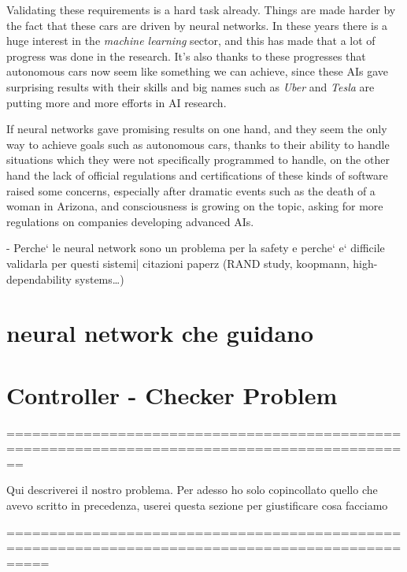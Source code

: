 Validating these requirements is a hard task already. Things are made harder by the fact that these cars are driven by neural networks.\newline
In these years there is a huge interest in the \textsl{machine learning} sector, and this has made that a lot of progress was done in the research. It's also thanks to these progresses that autonomous cars now seem like something we can achieve, since these AIs gave surprising results with their skills and big names such as \textsl{Uber} and \textsl{Tesla} are putting more and more efforts in AI research.

If neural networks gave promising results on one hand, and they seem the only way to achieve goals such as autonomous cars, thanks to their ability to handle situations which they were not specifically programmed to handle, on the other hand the lack of official regulations and certifications of these kinds of software raised some concerns, especially after dramatic events such as the death of a woman in Arizona\cite{arizuber}, and consciousness is growing on the topic, asking for more regulations on companies developing advanced AIs.\cite{elonmusk}
\newline\newline



- Perche` le neural network sono un problema per la safety e perche` e` difficile validarla per questi sistemi| citazioni paperz (RAND study, koopmann, high-dependability systems\dots)


\section{neural network che guidano}


\section{Controller - Checker Problem}

==============================================================================================

Qui descriverei il nostro problema. Per adesso ho solo copincollato quello che avevo scritto in precedenza, userei questa sezione per giustificare cosa facciamo

=================================================================================================


